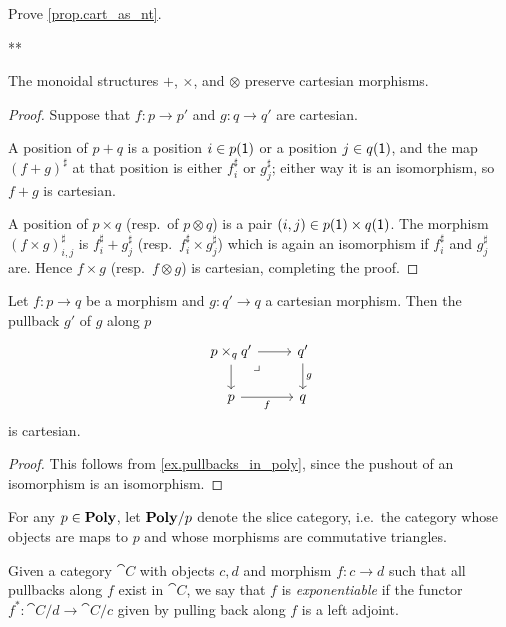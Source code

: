 \documentclass[Book-Poly]{subfiles}
\begin{document}
\begin{exercise}
Prove \cref{prop.cart_as_nt}.
\begin{solution}
**
\end{solution}
\end{exercise}

\begin{proposition}\label{prop.monoidal_pres_carts}
The monoidal structures $+$, $\times$, and $\otimes$ preserve cartesian morphisms.
\end{proposition}
\begin{proof}
Suppose that  $f\colon p\to p'$ and $g\colon q\to q'$ are cartesian. 

A position of $p+q$ is a position $i\in p(\textsf{1})$ or a position $j\in q(\textsf{1})$, and the map $(f+g)^\sharp$ at that position is either $f^\sharp_i$ or $g^\sharp_j$; either way it is an isomorphism, so $f+g$ is cartesian.

A position of $p\times q$ (resp.\ of $p\otimes q$) is a pair $(i,j)\in p(\textsf{1})\times q(\textsf{1})$. The morphism $(f\times g)^\sharp_{i,j}$ is $f^\sharp_i+g^\sharp_j$ (resp.\ $f^\sharp_i\times g^\sharp_j$) which is again an isomorphism if $f^\sharp_i$ and $g^\sharp_j$ are. Hence $f\times g$ (resp.\ $f\otimes g$) is cartesian, completing the proof.
\end{proof}

\begin{proposition}\label{prop.pullback_cartesian}
Let $f\colon p\to q$ be a morphism and $g\colon q'\to q$ a cartesian morphism. Then the pullback $g'$ of $g$ along $p$
\[
\begin{tikzcd}
	p\times_qq'\ar[r]\ar[d]&
	q'\ar[d, "g"]\\
	p\ar[r, "f"']&
	q\ar[ul, phantom, very near end, "\lrcorner"]
\end{tikzcd}
\]
is cartesian.
\end{proposition}
\begin{proof}
This follows from \cref{ex.pullbacks_in_poly}, since the pushout of an isomorphism is an isomorphism.
\end{proof}

For any $p\in\mathbf{Poly}$, let $\mathbf{Poly}/p$ denote the slice category, i.e.\ the category whose objects are maps to $p$ and whose morphisms are commutative triangles.

\begin{definition}
Given a category $\cat{C}$ with objects $c, d$ and morphism $f \colon c \to d$ such that all pullbacks along $f$ exist in $\cat{C}$, we say that $f$ is \emph{exponentiable} if the functor $f^* \colon \cat{C}/d \to \cat{C}/c$ given by pulling back along $f$ is a left adjoint.
\end{definition}
\end{document}
